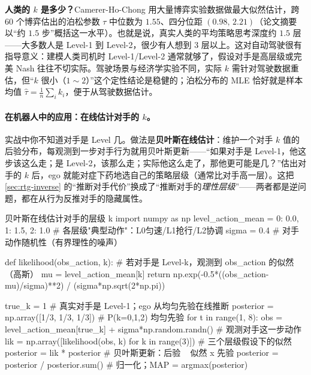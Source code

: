 \begin{note}
\textbf{人类的 $k$ 是多少？}\;Camerer-Ho-Chong 用大量博弈实验数据做最大似然估计，跨 $60$ 个博弈估出的泊松参数 $\tau$ 中位数为 $1.55$、四分位距 $(0.98,\,2.21)$（论文摘要以“约 $1.5$ 步”概括这一水平）\cite{camerer2004cognitive}。也就是说，真实人类的平均策略思考深度约 $1.5$ 层——大多数人是 Level-1 到 Level-2，很少有人想到 $3$ 层以上。这对自动驾驶很有指导意义：建模人类司机时 Level-1/Level-2 通常就够了，假设对手是高层级或完美 Nash 往往不切实际。驾驶场景与经济学实验不同，实际 $k$ 需针对驾驶数据重估，但“$k$ 很小（$1\sim2$）”这个定性结论是稳健的；泊松分布的 MLE 恰好就是样本均值 $\hat\tau=\tfrac1n\sum_i k_i$，便于从驾驶数据估计。
\end{note}

\paragraph{在机器人中的应用：在线估计对手的 $k$。}
实战中你不知道对手是 Level 几。做法是\textbf{贝叶斯在线估计}：维护一个对手 $k$ 值的后验分布，每观测到一步对手行为就用贝叶斯更新——“如果对手是 Level-1，他这步该这么走；是 Level-2，该那么走；实际他这么走了，那他更可能是几？”估出对手的 $k$ 后，ego 就能对症下药地选自己的策略层级（通常比对手高一层）。这把 \cref{sec:rtg-inverse} 的“推断对手代价”换成了“推断对手的\emph{理性层级}”——两者都是逆问题，都在从行为反推对手的隐藏属性。

\begin{codebox}[Python]{贝叶斯在线估计对手的层级 k}
import numpy as np
level_action_mean = {0: 0.0, 1: 1.5, 2: 1.0}   # 各层级"典型动作"：L0匀速/L1抢行/L2协调
sigma = 0.4                                     # 对手动作随机性（有界理性的噪声）

def likelihood(obs_action, k):                  # 若对手是 Level-k，观测到 obs_action 的似然（高斯）
    mu = level_action_mean[k]
    return np.exp(-0.5*((obs_action-mu)/sigma)**2) / (sigma*np.sqrt(2*np.pi))

true_k = 1                                       # 真实对手是 Level-1；ego 从均匀先验在线推断
posterior = np.array([1/3, 1/3, 1/3])           # P(k=0,1,2) 均匀先验
for t in range(1, 8):
    obs = level_action_mean[true_k] + sigma*np.random.randn()    # 观测对手这一步动作
    lik = np.array([likelihood(obs, k) for k in range(3)])       # 三个层级假设下的似然
    posterior = lik * posterior                                  # 贝叶斯更新：后验 ~ 似然 x 先验
    posterior = posterior / posterior.sum()                      # 归一化；MAP = argmax(posterior)
\end{codebox}

